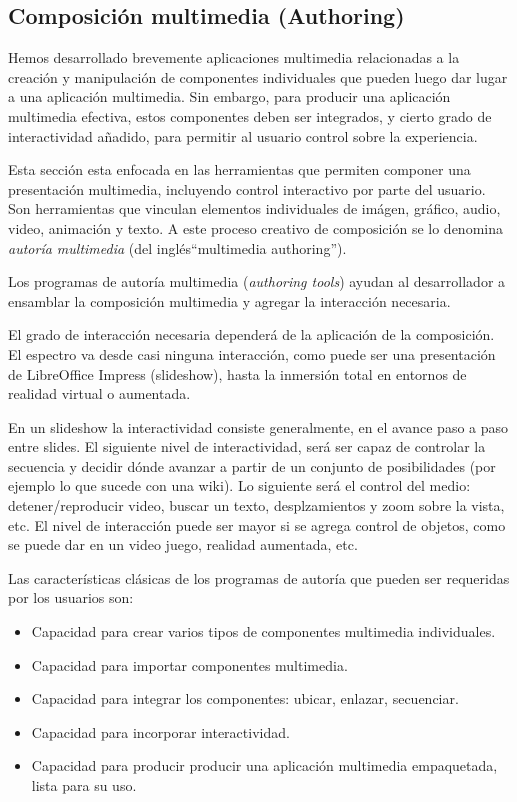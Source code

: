 \documentclass[12pt]{article}
\begin{document}
\subsection*{Composición multimedia (Authoring)}

Hemos desarrollado brevemente aplicaciones multimedia relacionadas a la 
creación y manipulación de componentes individuales que pueden luego 
dar lugar a una aplicación multimedia. Sin embargo, para producir 
una aplicación multimedia efectiva, estos componentes deben ser 
integrados, y cierto grado de interactividad añadido, para permitir
al usuario control sobre la experiencia. 

Esta sección esta enfocada en las herramientas que permiten componer una 
presentación multimedia, incluyendo 
control interactivo por parte del usuario. Son herramientas que vinculan 
elementos individuales de imágen, gráfico, audio, video, animación y texto. 
A este proceso creativo de composición se lo denomina {\it autoría multimedia} 
(del inglés``multimedia authoring''). 

Los programas de autoría multimedia ({\it authoring tools}) ayudan al desarrollador
a ensamblar la composición multimedia y agregar la interacción necesaria. 

El grado de interacción necesaria dependerá de la aplicación de la 
composición. El espectro va desde casi ninguna interacción, como puede 
ser una presentación de LibreOffice Impress (slideshow), hasta la inmersión 
total en entornos de realidad virtual o aumentada. 

En un slideshow la interactividad consiste generalmente, en el avance 
paso a paso entre slides. El siguiente nivel de interactividad, será ser
capaz de controlar la secuencia y decidir dónde avanzar a partir de 
un conjunto de posibilidades (por ejemplo lo que sucede con una wiki). 
Lo siguiente será el control del medio: detener/reproducir video, 
buscar un texto, desplzamientos y zoom sobre la vista, etc.  
El nivel de interacción puede ser mayor si se agrega control de objetos, 
como se puede dar en un video juego, realidad aumentada, etc. 


Las características clásicas de los programas de autoría que pueden 
ser requeridas por los usuarios son: 

\begin{itemize}
\item Capacidad para crear varios tipos de componentes multimedia individuales.
\item Capacidad para importar componentes multimedia.
\item Capacidad para integrar los componentes: ubicar, enlazar, secuenciar. 
\item Capacidad para incorporar interactividad. 
\item Capacidad para producir producir una aplicación multimedia empaquetada, 
lista para su uso. 
\end{itemize}
\end{document}
